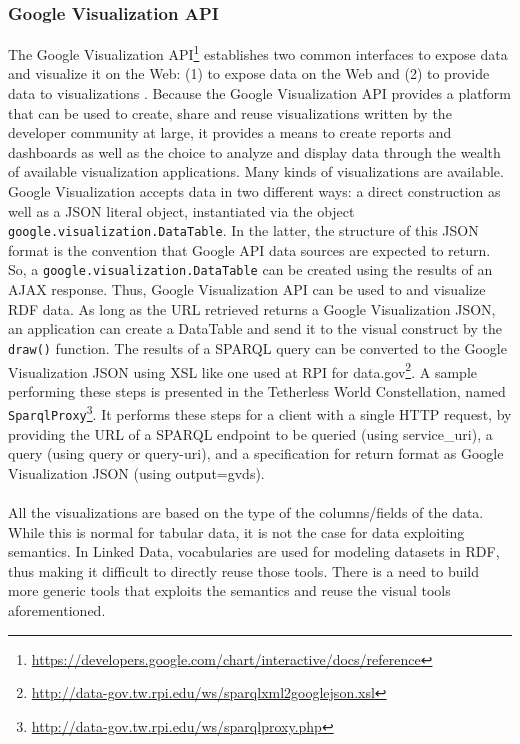 \subsubsection{Google Visualization API}
The Google Visualization API\footnote{\url{https://developers.google.com/chart/interactive/docs/reference}} establishes two common interfaces to expose data and visualize it on the Web: (1) to expose data on the Web and (2) to provide data to visualizations \cite{rpi2012}. Because the Google Visualization API provides a platform that can be used to create, share and reuse visualizations written by the developer community at large, it provides a means to create reports and dashboards as well as the choice to analyze and display data through the wealth of available visualization applications. Many kinds of visualizations are available. Google Visualization accepts data in two different ways: a direct construction as well as  a JSON literal object, instantiated via the object \texttt{google.visualization.DataTable}. In the latter, the structure of this JSON format is the convention that Google API data sources are expected to return. So, a \texttt{google.visualization.DataTable} can be created using the results of an AJAX response. Thus, Google Visualization API can be used to and visualize RDF data. As long as the URL retrieved returns a Google Visualization JSON, an application can create a DataTable and send it to the visual construct by the \texttt{draw()} function.  The results of a SPARQL query can be converted to the Google Visualization JSON using XSL like one used at RPI for data.gov\footnote{\url{http://data-gov.tw.rpi.edu/ws/sparqlxml2googlejson.xsl}}. A sample performing these steps is presented in the Tetherless World Constellation, named \texttt{SparqlProxy}\footnote{\url{http://data-gov.tw.rpi.edu/ws/sparqlproxy.php}}. It performs these steps for a client with a single HTTP request, by providing the URL of a SPARQL endpoint to be queried (using service\_uri), a query (using query or query-uri), and a specification for return format as Google Visualization JSON (using output=gvds).

\paragraph{}
All the visualizations are based on the type of the columns/fields of the data. While this is normal for tabular data, it is not the case for data exploiting semantics. In Linked Data, vocabularies are used for modeling datasets in RDF, thus making it difficult to directly reuse  those tools. There is a need to build more generic tools that exploits the semantics and reuse the visual tools aforementioned.

